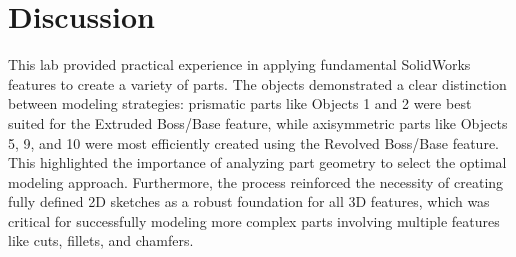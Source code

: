 \section{Discussion}

This lab provided practical experience in applying fundamental SolidWorks features to create a variety of parts. The objects demonstrated a clear distinction between modeling strategies: prismatic parts like Objects 1 and 2 were best suited for the Extruded Boss/Base feature, while axisymmetric parts like Objects 5, 9, and 10 were most efficiently created using the Revolved Boss/Base feature. This highlighted the importance of analyzing part geometry to select the optimal modeling approach. Furthermore, the process reinforced the necessity of creating fully defined 2D sketches as a robust foundation for all 3D features, which was critical for successfully modeling more complex parts involving multiple features like cuts, fillets, and chamfers.
